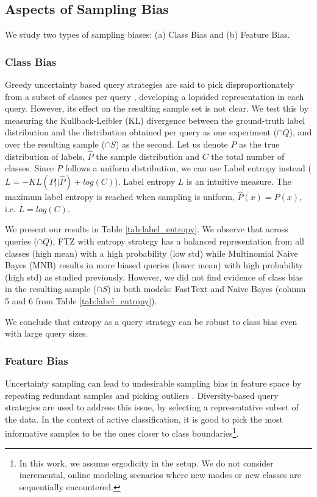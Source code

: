 \documentclass[11pt,a4paper]{article}
\begin{document}
\subsection{Aspects of Sampling Bias}\label{sec:biases}

We study two types of sampling biases: (a) Class Bias and (b) Feature Bias.

\subsubsection{Class Bias}
Greedy uncertainty based query strategies are said to pick disproportionately from a subset of classes per query \cite{sener2018active, ebert2012ralf}, developing a lopsided representation in each query. However, its effect on the resulting sample set is not clear. We test this by measuring the Kullback-Leibler (KL) divergence between the ground-truth label distribution and the distribution obtained per query as one experiment ($\cap Q$), and over the resulting sample ($\cap S$) as the second. Let us denote $P$ as the true distribution of labels, $\hat{P}$ the sample distribution and $C$ the total number of classes. Since $P$ follows a uniform distribution, we can use Label entropy instead ($ L = -KL(P||\hat{P}) + log(C)$). Label entropy $L$ is an intuitive measure. The maximum label entropy is reached when sampling is uniform, $\hat{P}(x)=P(x)$, i.e. $L = log(C)$.



We present our results in Table \ref{tab:label_entropy}. We observe that across queries ($\cap Q$), FTZ with entropy strategy has a balanced representation from all classes (high mean) with a high probability (low std) while Multinomial Naive Bayes (MNB) results in more biased queries (lower mean) with high probability (high std) as studied previously.
However, we did not find evidence of class bias in the resulting sample ($\cap S$) in both models: FastText and Naive Bayes (column 5 and 6 from Table \ref{tab:label_entropy}). 

We conclude that entropy as a query strategy can be robust to class bias even with large query sizes. 

\subsubsection{Feature Bias}
Uncertainty sampling can lead to undesirable sampling bias in feature space \cite{settles2009active} by repeating redundant samples and picking outliers \cite{zhu2008active}. Diversity-based query strategies \cite{sener2018active} are used to address this issue, by selecting a representative subset of the data. In the context of active classification, it is good to pick the most informative samples to be the ones closer to class boundaries\footnote{In this work, we assume ergodicity in the setup. We do not consider incremental, online modeling scenarios where new modes or new classes are sequentially encountered.}. 
\end{document}
